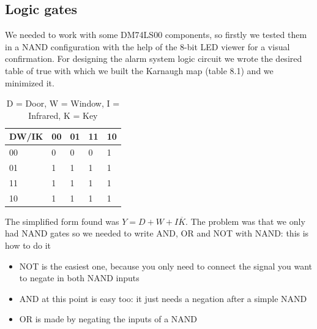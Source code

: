 \subsection{Logic gates}
We needed to work with some DM74LS00 components, so firstly we tested them in a NAND configuration with the help of the 8-bit LED viewer for a visual confirmation.
For designing the alarm system logic circuit we wrote the desired table of true with which we built the Karnaugh map (table 8.1) and we minimized it.
\begin{table}[H]
\centering
\label{my-label}
\begin{tabular}{lllll}
\hline
 DW/IK & 00 & 01 & 11 & 10 \\ \hline
 00    & 0  & 0  & 0  & 1 \\
 01    & 1  & 1  & 1  & 1 \\
 11    & 1  & 1  & 1  & 1 \\ 
 10    & 1  & 1  & 1  & 1 \\ \hline
\end{tabular}\caption{D = Door, W = Window, I = Infrared, K = Key}
\end{table}
The simplified form found was $Y = D + W + I\overline{K}$. The problem was that we only had NAND gates so we needed to write AND, OR and NOT with NAND: this is how to do it
\begin{itemize}
\item NOT is the easiest one, because you only need to connect the signal you want to negate in both NAND inputs
\item AND at this point is easy too: it just needs a negation after a simple NAND
\item OR is made by negating the inputs of a NAND
\end{itemize}

